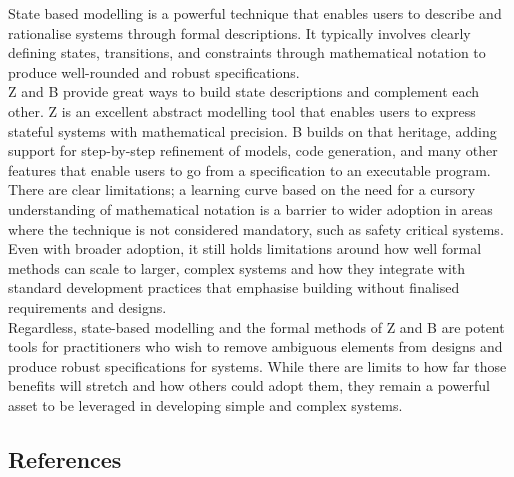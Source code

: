 \documentclass{article}
\begin{document}
State based modelling is a powerful technique that enables users to describe and rationalise systems through formal descriptions. It typically involves clearly defining states, transitions, and constraints through mathematical notation to produce well-rounded and robust specifications. \\
\newline
Z and B provide great ways to build state descriptions and complement each other. Z is an excellent abstract modelling tool that enables users to express stateful systems with mathematical precision. B builds on that heritage, adding support for step-by-step refinement of models, code generation, and many other features that enable users to go from a specification to an executable program. \\
\newline
There are clear limitations; a learning curve based on the need for a cursory understanding of mathematical notation is a barrier to wider adoption in areas where the technique is not considered mandatory, such as safety critical systems. Even with broader adoption, it still holds limitations around how well formal methods can scale to larger, complex systems and how they integrate with standard development practices that emphasise building without finalised requirements and designs. \\
\newline
Regardless, state-based modelling and the formal methods of Z and B are potent tools for practitioners who wish to remove ambiguous elements from designs and produce robust specifications for systems. While there are limits to how far those benefits will stretch and how others could adopt them, they remain a powerful asset to be leveraged in developing simple and complex systems. 
\pagebreak

\subsection*{References}
\end{document}

